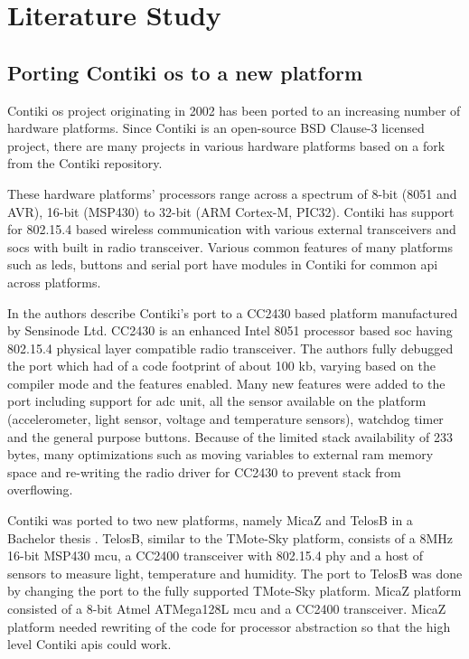 \chapter{Literature Study}

\section{Porting Contiki \gls{os} to a new platform}
Contiki \gls{os} project originating in 2002 has been ported to an increasing number of hardware platforms\cite{contikiHw}. Since Contiki is an open-source BSD Clause-3 licensed project, there are many projects in various hardware platforms based on a fork from the Contiki repository.

These hardware platforms' processors range across a spectrum of 8-bit (8051 and AVR), 16-bit (MSP430) to 32-bit (ARM Cortex-M, PIC32). Contiki has support for 802.15.4 based wireless communication with various external transceivers and \glspl{soc} with built in radio transceiver. Various common features of many platforms such as \glspl{led}, buttons and serial port have modules in Contiki for common \gls{api} across platforms.

In \cite{Oikonomou2011} the authors describe Contiki's port to a CC2430 based platform manufactured by Sensinode Ltd. CC2430 is an enhanced Intel 8051 processor based \gls{soc} having 802.15.4 physical layer compatible radio transceiver. The authors fully debugged the port which had of a code footprint of about 100 \gls{kb}, varying based on the compiler mode and the features enabled. Many new features were added to the port including support for \gls{adc} unit, all the sensor available on the platform (accelerometer, light sensor, voltage and temperature sensors), watchdog timer and the general purpose buttons. Because of the limited stack availability of 233 bytes, many optimizations such as moving variables to external \gls{ram} memory space and re-writing the radio driver for CC2430 to prevent stack from overflowing.

Contiki was ported to two new platforms, namely MicaZ and TelosB in a Bachelor thesis \cite{stan2007porting}. TelosB, similar to the TMote-Sky platform, consists of a 8MHz 16-bit MSP430 \gls{mcu}, a CC2400 transceiver with 802.15.4 \gls{phy} and a host of sensors to measure light, temperature and humidity. The port to TelosB was done by changing the port to the fully supported TMote-Sky platform. MicaZ platform consisted of a 8-bit Atmel ATMega128L \gls{mcu} and a CC2400 transceiver. MicaZ platform needed rewriting of the code for processor abstraction so that the high level Contiki \glspl{api} could work.

